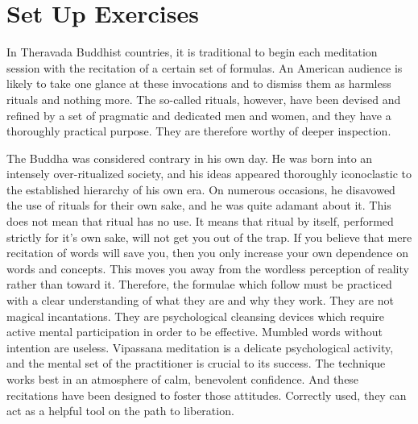
\section{ Set Up Exercises} 
In Theravada Buddhist countries, it is traditional to begin each meditation
session with the recitation of a certain set of formulas.  An American audience
is likely to take one glance at these invocations and to dismiss them as
harmless rituals and nothing more.  The so-called rituals, however, have been
devised and refined by a set of pragmatic and dedicated men and women, and they
have a thoroughly practical purpose. They are therefore worthy of deeper
inspection.

The Buddha was considered contrary in his own day. He was born into an intensely
over-ritualized society, and his ideas appeared thoroughly iconoclastic to the
established hierarchy of his own era. On numerous occasions, he disavowed the
use of rituals for their own sake, and he was quite adamant about it. This does
not mean that ritual has no use. It means that ritual by itself, performed
strictly for it's own sake, will not get you out of the trap. If you believe
that mere recitation of words will save you, then you only increase your own
dependence on words and concepts. This moves you away from the wordless
perception of reality rather than toward it. Therefore, the formulae which
follow must be practiced with a clear understanding of what they are and why
they work. They are not magical incantations. They are psychological cleansing
devices which require active mental participation in order to be effective.
Mumbled words without intention are useless. Vipassana meditation is a delicate
psychological activity, and the mental set of the practitioner is crucial to its
success. The technique works best in an atmosphere of calm, benevolent
confidence. And these recitations have been designed to foster those attitudes.
Correctly used, they can act as a helpful tool on the path to liberation.


